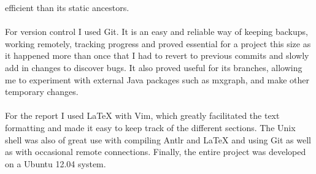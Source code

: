 \documentclass{report}
\begin{document}
efficient than its static ancestors.
\\ \\
For version control I used Git\cite{progit}. It is an easy and reliable way of 
keeping backups, working remotely, tracking progress and proved essential for a 
project this size as it happened more than once that I had to revert to previous 
commits and slowly add in changes to discover bugs. It also proved useful for 
its branches, allowing me to experiment with external Java packages such as 
mxgraph, and make other temporary changes.
\\ \\
For the report I used LaTeX\cite{latex} with Vim, which greatly facilitated the 
text formatting and made it easy to keep track of the different sections. The 
Unix shell was also of great use with compiling Antlr and LaTeX and using 
Git as well as with occasional remote connections. Finally, the entire project 
was developed on a Ubuntu 12.04 system.
\end{document}
